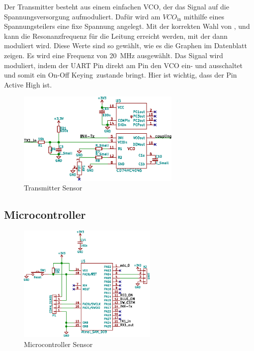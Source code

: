 Der  Transmitter  besteht  aus  einem   einfachen  VCO,  der  das  Signal  auf
die  Spannungsversorgung aufmoduliert.   Daf\"ur  wird am  $VCO_{\mathrm{in}}$
mithilfe eines Spannungsteilers eine fixe Spannung angelegt. Mit der korrekten
Wahl von ,   und  kann  die Resonanzfrequenz f\"ur
die Leitung erreicht werden, mit der  dann moduliert wird. Diese Werte sind so
gew\"ahlt,  wie es  die  Graphen im  Datenblatt \cite{ref:ti:cd54}  zeigen. Es
wird  eine Frequenz  von  \SI{20}{\mega\hertz}  ausgew\"ahlt. Das Signal  wird
moduliert, indem der UART  Pin  direkt am  Pin den VCO ein-
und  ausschaltet  und  somit  ein  On-Off  Keying zustande  bringt. Hier  ist
wichtig, dass der Pin Active High ist.

\begin{figure}[h!t]
    \centering
    \includegraphics[width=0.70\textwidth]{images/sensor-sch/sensor--sch--transmitter.eps}
    \caption[Sensor: Schema Transmitter]{Transmitter Sensor}
\end{figure}


\subsection{Microcontroller}
\label{subsec:hw:sensor:mcu}

\begin{figure}
    \centering
    \includegraphics[width=0.60\textwidth]{images/sensor-sch/sensor--sch--mcu.eps}
    \caption[Sensor: Schema Microcontroller]{Microcontroller Sensor}
\end{figure}

